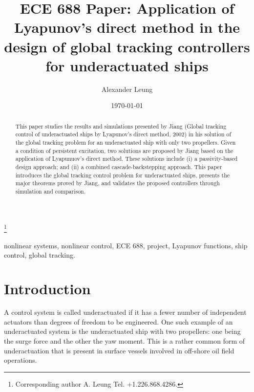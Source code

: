 \documentclass[amsthm, twocolumn]{autart}
\date{\today}
\begin{document}
\begin{frontmatter}
\title{{\sf ECE 688 Paper: Application of Lyapunov's direct method in the design of global tracking controllers for underactuated ships}}


\thanks[footnoteinfo]{Corresponding author A. Leung
  Tel. +1.226.868.4286.}


\author[Waterloo]{{\sf Alexander Leung}}

\address[Waterloo]{Department of Electrical and
  Computer Engineering, University of Waterloo, 200 University Ave. W,
  Waterloo, Ontario, N2L 3G1, Canada.}

          
\begin{keyword}                           
nonlinear systems, nonlinear control, ECE 688, project, Lyapunov functions, ship control, global tracking.
\end{keyword}                             
%
%
\begin{abstract}                          %
This paper studies the results and simulations presented by Jiang (Global tracking control of underactuated ships by Lyapunov's direct method, 2002) in his solution of the global tracking problem for an underactuated ship with only two propellers. Given a condition of persistent excitation, two solutions are proposed by Jiang based on the application of Lyapunuov's direct method. These solutions include (i) a passivity-based design approach; and (ii) a combined cascade-backstepping approach. This paper introduces the global tracking control problem for underactuated ships, presents the major theorems proved by Jiang, and validates the proposed controllers through simulation and comparison.
\end{abstract}
%
%
\end{frontmatter}

\section{Introduction}
A control system is called {\sf underactuated} if it has a fewer number of independent actuators than degrees of freedom to be engineered. One such example of an underactuated system is the underactuated ship with two propellers: one being the surge force and the other the yaw moment. This is a rather common form of underactuation that is present in surface vessels involved in off-shore oil field operations.
\end{document}
